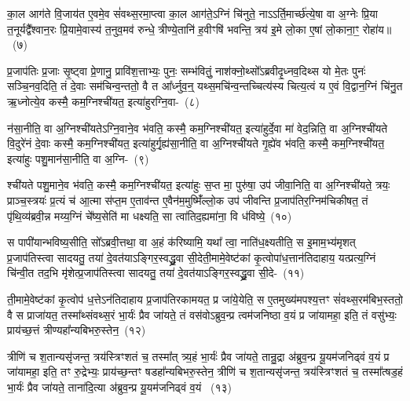का॒ल आग॑ते वि॒जाय॑त ए॒वमे॒व सं॑वथ्स॒रमा॒प्त्वा का॒ल आग॑ते॒\-ऽग्निं चि॑नुते॒ नाऽऽर्ति॒मार्च्छ॑त्ये॒षा वा अ॒ग्नेः प्रि॒या त॒नूर्यद्वै᳚श्वान॒रः प्रि॒यामे॒वास्य॑ त॒नुव॒मव॑ रुन्धे॒ त्रीण्ये॒तानि॑ ह॒वीꣳषि॑ भवन्ति॒ त्रय॑ इ॒मे लो॒का ए॒षां लो॒काना॒ꣳ॒ रोहा॑य॥~(७)\ip

{\anuvakamend[{य॒द्रिय॑ङ्वा॒युर्यच्छ्म॑श्रु॒णस्तद्वा॒योर्नि॒र्वप॑ति दे॒वता॒स्तस्मा॑दा॒प्त्वाष्टात्रिꣳ॑शच्च}]}

प्र॒जा\-प॑तिः प्र॒जाः सृ॒ष्ट्वा प्रे॒णानु॒ प्रावि॑श॒त्ताभ्यः॒ पुनः॒ सम्भ॑वितुं॒ नाश॑क्नो॒थ्सो᳚\-ऽब्रवीदृ॒ध्नव॒दिथ्स यो मे॒तः पुनः॑ सञ्चि॒नव॒दिति॒ तं दे॒वाः सम॑चिन्व॒न्ततो॒ वै त आ᳚र्ध्नुव॒न्॒ यथ्स॒मचि॑न्व॒न्तच्चित्य॑स्य चित्य॒त्वं य ए॒वं वि॒द्वान॒ग्निं चि॑नु॒त ऋ॒ध्नोत्ये॒व कस्मै॒ कम॒ग्निश्ची॑यत॒ इत्या॑हुरग्नि॒वा-~(८)\ip

न॑सा॒नीति॒ वा अ॒ग्निश्ची॑यते\-ऽग्नि॒वाने॒व भ॑वति॒ कस्मै॒ कम॒ग्निश्ची॑यत॒ इत्या॑हुर्दे॒वा मा॑ वेद॒न्निति॒ वा अ॒ग्निश्ची॑यते वि॒दुरे॑नं दे॒वाः कस्मै॒ कम॒ग्निश्ची॑यत॒ इत्या॑हुर्गृ॒ह्य॑सा॒नीति॒ वा अ॒ग्निश्ची॑यते गृ॒ह्ये॑व भ॑वति॒ कस्मै॒ कम॒ग्निश्ची॑यत॒ इत्या॑हुः पशु॒मान॑सा॒नीति॒ वा अ॒ग्नि-~(९)\ip

श्ची॑यते पशु॒माने॒व भ॑वति॒ कस्मै॒ कम॒ग्निश्ची॑यत॒ इत्या॑हुः स॒प्त मा॒ पुरु॑षा॒ उप॑ जीवा॒निति॒ वा अ॒ग्निश्ची॑यते॒ त्रयः॒ प्राञ्च॒स्त्रयः॑ प्र॒त्यं च॑ आ॒त्मा स॑प्त॒म ए॒ताव॑न्त ए॒वैन॑म॒मुष्मिँ॑ल्लो॒क उप॑ जीवन्ति प्र॒जा\-प॑तिर॒ग्निम॑चिकीषत॒ तं पृ॑थि॒व्य॑ब्रवी॒न्न मय्य॒ग्निं चे᳚ष्य॒सेति॑ मा धक्ष्यति॒ सा त्वा॑तिद॒ह्यमा॑ना॒ वि ध॑विष्ये॒~(१०)\ip

स पापी॑यान्भविष्य॒सीति॒ सो᳚\-ऽब्रवी॒त्तथा॒ वा अ॒हं क॑रिष्यामि॒ यथा᳚ त्वा॒ नाति॑ध॒क्ष्यतीति॒ स इ॒माम॒भ्य॑मृशत् प्र॒जा\-प॑तिस्त्वा सादयतु॒ तया॑ दे॒वत॑या\-ऽ\-ङ्गिर॒स्वद्ध्रु॒वा सी॒देती॒मामे॒वेष्ट॑कां कृ॒त्वोपा॑ध॒त्तान॑तिदाहाय॒ यत्प्रत्य॒ग्निं चि॑न्वी॒त तद॒भि मृ॑शेत्प्र॒जा\-प॑तिस्त्वा सादयतु॒ तया॑ दे॒वत॑या\-ऽ\-ङ्गिर॒स्वद्ध्रु॒वा सी॒दे-~(११)\ip

ती॒मामे॒वेष्ट॑कां कृ॒त्वोप॑ ध॒त्ते\-ऽन॑तिदाहाय प्र॒जा\-प॑तिरकामयत॒ प्र जा॑ये॒येति॒ स ए॒तमुख्य॑मपश्य॒त्तꣳ सं॑वथ्स॒रम॑बिभ॒स्ततो॒ वै स प्राजा॑यत॒ तस्मा᳚थ्संवथ्स॒रं भा॒र्यः॑ प्रैव जा॑यते॒ तं वस॑वो\-ऽब्रुव॒न्प्र त्वम॑जनिष्ठा व॒यं प्र जा॑यामहा॒ इति॒ तं वसु॑भ्यः॒ प्राय॑च्छ॒त्तं त्रीण्यहा᳚न्यबिभरु॒स्तेन॒~(१२)\ip

त्रीणि॑ च श॒तान्यसृ॑जन्त॒ त्रय॑स्त्रिꣳशतं च॒ तस्मा᳚त् त्र्य॒हं भा॒र्यः॑ प्रैव जा॑यते॒ तान्रु॒द्रा अ॑ब्रुव॒न्प्र यू॒यम॑जनिढ्वं व॒यं प्र जा॑यामहा॒ इति॒ तꣳ रु॒द्रेभ्यः॒ प्राय॑च्छ॒न्तꣳ षडहा᳚न्यबिभरु॒स्तेन॒ त्रीणि॑ च श॒तान्यसृ॑जन्त॒ त्रय॑स्त्रिꣳशतं च॒ तस्मा᳚त्षड॒हं भा॒र्यः॑ प्रैव जा॑यते॒ ताना॑दि॒त्या अ॑ब्रुव॒न्प्र यू॒यम॑जनिढ्वं व॒यं ~(१३)\ip

